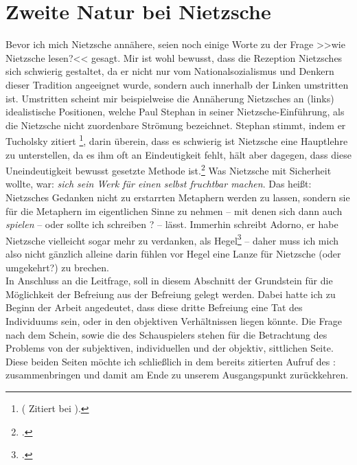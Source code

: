 \documentclass[12pt, a4paper, openany]{report}
\begin{document}
\section{Zweite Natur bei Nietzsche}\label{abschnitt_2}
Bevor ich mich Nietzsche annähere, seien noch einige Worte zu der Frage >>wie Nietzsche lesen?<< gesagt.
Mir ist wohl bewusst, dass die Rezeption Nietzsches sich schwierig gestaltet, da er nicht nur vom Nationalsozialismus und Denkern dieser Tradition angeeignet wurde, sondern auch innerhalb der Linken umstritten ist.
Umstritten scheint mir beispielweise die Annäherung Nietzsches an (links) idealistische Positionen, welche Paul Stephan in seiner Nietzsche-Einführung, als die Nietzsche nicht zuordenbare Strömung bezeichnet.
Stephan stimmt, indem er Tucholsky zitiert%
 \footnote{
     ( Zitiert bei \cite[][17]{stephan_nietzscheanismus_2019}).
},
darin überein, dass es schwierig ist Nietzsche eine Hauptlehre zu unterstellen, da es ihm oft an Eindeutigkeit fehlt, hält aber dagegen, dass diese Uneindeutigkeit bewusst gesetzte Methode ist.\footcite[Vgl.][18]{stephan_nietzscheanismus_2019}
Was Nietzsche mit Sicherheit wollte, war: \emph{sich sein Werk für einen selbst fruchtbar machen}. 
Das heißt: Nietzsches Gedanken nicht zu erstarrten Metaphern werden zu lassen, sondern sie für die Metaphern im eigentlichen Sinne zu nehmen -- mit denen sich dann auch \emph{spielen} -- oder sollte ich schreiben ? -- lässt.
Immerhin schreibt Adorno, er habe Nietzsche vielleicht sogar mehr zu verdanken, als Hegel\footcite[Vgl.][255]{adorno_vorlesung_2010}
-- daher muss ich mich also nicht gänzlich alleine darin fühlen vor Hegel eine Lanze für Nietzsche (oder umgekehrt?) zu brechen.\\

In Anschluss an die Leitfrage, soll in diesem Abschnitt der Grundstein für die Möglichkeit der Befreiung aus der Befreiung gelegt werden.
Dabei hatte ich zu Beginn der Arbeit angedeutet, dass diese dritte Befreiung eine Tat des Individuums sein, oder in den objektiven Verhältnissen liegen könnte. 
Die Frage nach dem Schein, sowie die des Schauspielers stehen für die Betrachtung des Problems von der subjektiven, individuellen und der objektiv, sittlichen Seite. 
Diese beiden Seiten möchte ich schließlich in dem bereits zitierten Aufruf des :  zusammenbringen und damit am Ende zu unserem Ausgangspunkt zurückkehren. 
\end{document}

